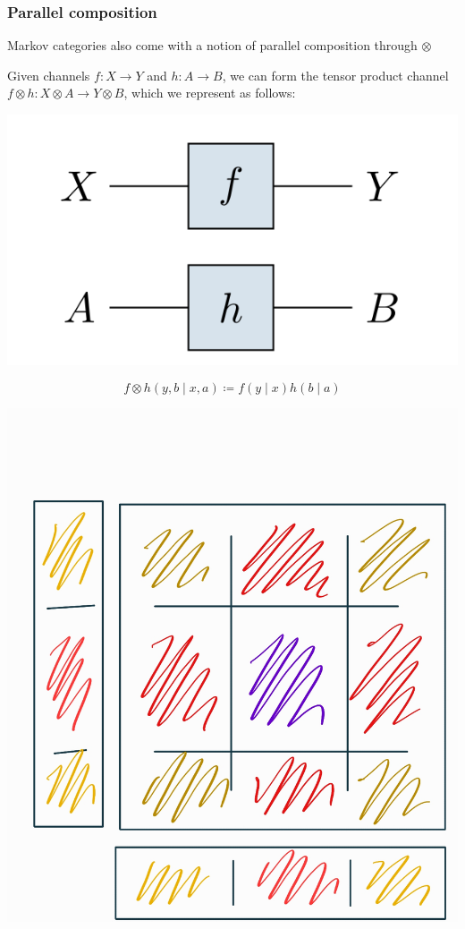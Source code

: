 \begin{frame}
    \frametitle{Parallel composition} 
Markov categories also come with a notion of parallel composition through $\otimes$\par
Given channels $f: X\to Y$ and $h: A\to B$, we can form the tensor product channel $f\otimes h: X\otimes A\to Y\otimes B$, which we represent as follows:\pause

\begin{minipage}{.4\textwidth}
    \includegraphics[width=\textwidth]{graphics/string/markov_parallel.png}
\end{minipage}
\hfill
\begin{minipage}{.55\textwidth}
    \[
        f\otimes h(y, b\mid x, a)\coloneqq f(y\mid x)h(b\mid a)
    \]
\end{minipage}
\end{frame}

\begin{frame}
    \begin{center}
        \includegraphics[width=.5\textwidth]{graphics/parallel_dist.jpg}
    \end{center}
\end{frame}

